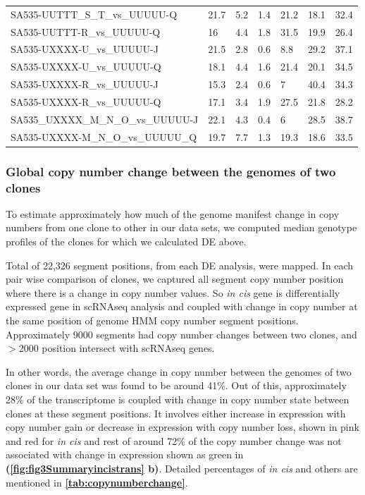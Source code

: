 \begin{landscape}
\begin{table}
{\begin{tabular}{|l|p{4em}|p{4em}|p{4em}|p{4em}|p{4em}|p{4em}|}
SA535-UUTTT\_S\_T\_vs\_UUUUU-Q    & 21.7 & 5.2 & 1.4 & 21.2 & 18.1 & 32.4 \\
SA535-UUTTT-R\_vs\_UUUUU-Q       & 16   & 4.4 & 1.8 & 31.5 & 19.9 & 26.4 \\
SA535-UXXXX-U\_vs\_UUUUU-J       & 21.5 & 2.8 & 0.6 & 8.8  & 29.2 & 37.1 \\
SA535-UXXXX-U\_vs\_UUUUU-Q       & 18.1 & 4.4 & 1.6 & 21.4 & 20.1 & 34.5 \\
SA535-UXXXX-R\_vs\_UUUUU-J       & 15.3 & 2.4 & 0.6 & 7    & 40.4 & 34.3 \\
SA535-UXXXX-R\_vs\_UUUUU-Q       & 17.1 & 3.4 & 1.9 & 27.5 & 21.8 & 28.2 \\
SA535\_UXXXX\_M\_N\_O\_vs\_UUUUU-J & 22.1 & 4.3 & 0.4 & 6    & 28.5 & 38.7 \\
SA535-UXXXX-M\_N\_O\_vs\_UUUUU\_Q & 19.7 & 7.7 & 1.3 & 19.3 & 18.6 & 33.5 \\
  \hline
 \end{tabular}%
 }
\label{tab:DEpercentageincisintrans}
\end{table}
\end{landscape}






\subsubsection{Global copy number change between the genomes of two clones}

To estimate approximately how much of the genome manifest change in copy numbers from one clone to other in our data sets, we computed median genotype profiles of the clones for which we calculated \ac{DE} above.

Total of 22,326 segment positions, from each DE analysis, were mapped. In each pair wise comparison of clones, we captured all segment copy number position where there is a change in copy number values. So \textit{in cis} gene is differentially expressed gene in scRNAseq analysis and coupled with change in copy number at the same position of genome HMM copy number segment positions. Approximately 9000 segments had copy number changes between two clones, and $>$2000 position intersect with scRNAseq genes.

In other words, the average change in copy number between the genomes of two clones in our data set was found to be around 41\%. Out of this, approximately 28\% of the transcriptome is coupled with change in copy number state between clones at these segment positions. It involves either increase in expression with copy number gain or decrease in expression with copy number loss, shown in pink and red for \textit{in cis} and rest of around 72\% of the copy number change was not associated with change in expression shown as green in \textbf{(\autoref{fig:fig3Summaryincistrans} b)}. Detailed percentages of \textit{in cis} and others are mentioned in \textbf{\autoref{tab:copynumberchange}}.

